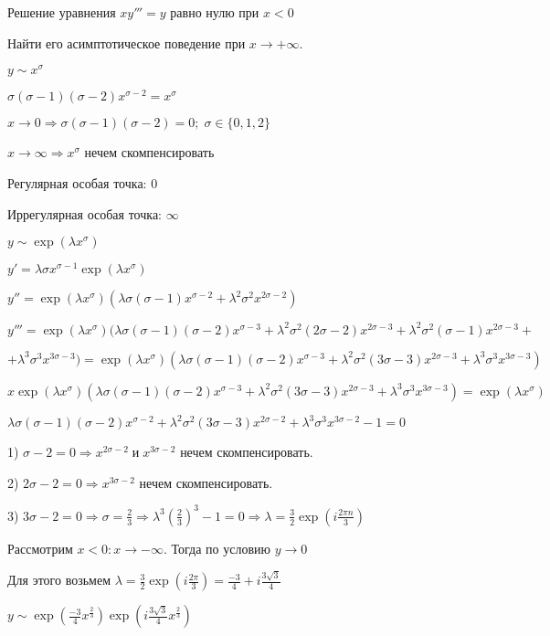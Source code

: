 
 

Решение уравнения $x y'''=y$ равно нулю при $x<0$

Найти его асимптотическое поведение при $x \to +\infty$.

$y \sim x^\sigma$

$\sigma (\sigma -1) (\sigma - 2) x^{\sigma - 2} = x^\sigma$

$x \to 0 \Rightarrow \sigma (\sigma -1) (\sigma - 2) = 0 ; \; \sigma \in \{0, 1, 2\}$
 
$x \to \infty \Rightarrow x^\sigma$ нечем скомпенсировать

Регулярная особая точка: 0

Иррегулярная особая точка: $\infty$

$y \sim \exp (\lambda x^\sigma)$

$y' = \lambda \sigma x^{\sigma - 1} \exp (\lambda x^\sigma) $

$y'' =\exp (\lambda x^\sigma) (\lambda \sigma (\sigma-1) x^{\sigma - 2} + \lambda^2 \sigma^2 x^{2\sigma - 2})   $

$y''' =\exp (\lambda x^\sigma) (\lambda \sigma (\sigma-1)(\sigma-2) x^{\sigma - 3} + \lambda^2 \sigma^2 (2\sigma-2) x^{2\sigma - 3} + \lambda^2 \sigma^2 (\sigma-1) x^{2\sigma - 3} +$

$+ \lambda^3 \sigma^3  x^{3\sigma - 3})  = \exp (\lambda x^\sigma) (\lambda \sigma (\sigma-1)(\sigma-2) x^{\sigma - 3} + \lambda^2 \sigma^2 (3\sigma-3) x^{2\sigma - 3}  + \lambda^3 \sigma^3  x^{3\sigma - 3}) $

$x \exp (\lambda x^\sigma) (\lambda \sigma (\sigma-1)(\sigma-2) x^{\sigma - 3} + \lambda^2 \sigma^2 (3\sigma-3) x^{2\sigma - 3}  + \lambda^3 \sigma^3  x^{3\sigma - 3}) = \exp (\lambda x^\sigma) $

$\lambda \sigma (\sigma-1)(\sigma-2) x^{\sigma - 2} + \lambda^2 \sigma^2 (3\sigma-3) x^{2\sigma - 2}  + \lambda^3 \sigma^3  x^{3\sigma - 2} - 1 = 0 $

1) $\sigma - 2 = 0 \Rightarrow x^{2\sigma - 2} \; \text{и} \; x^{3\sigma - 2}$ нечем скомпенсировать.

2) $2\sigma - 2 = 0 \Rightarrow  x^{3\sigma - 2}$ нечем скомпенсировать.

3) $3\sigma - 2 = 0 \Rightarrow  \sigma = \frac{2}{3} \Rightarrow \lambda^3 (\frac{2}{3})^3-1=0 \Rightarrow \lambda = \frac{3}{2} \exp(i \frac{2 \pi n}{3}) $ 

Рассмотрим $x<0 : x \to -\infty$. Тогда по условию $y \to 0$

Для этого возьмем $\lambda = \frac{3}{2} \exp(i \frac{2 \pi }{3}) = \frac{-3}{4}+i\frac{3 \sqrt{3}}{4}$

$y \sim \exp(\frac{-3}{4} x^{\frac{2}{3}}) \exp(i\frac{3 \sqrt{3}}{4} x^{\frac{2}{3}})$
